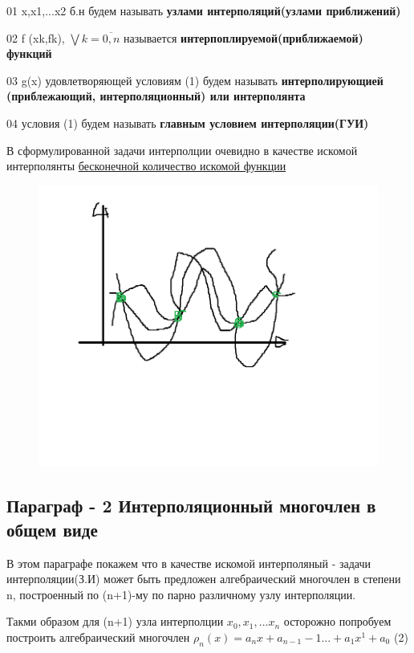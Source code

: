\documentclass{article}
\begin{document}
01 x,x1,...x2 б.н будем называть \textbf{узлами интерполяций(узлами приближений)}

\vspace{3mm}

02 f (xk,fk), $\bigvee k =\overline{0,n}$ называется \textbf{интерпоплируемой(приближаемой) функций}

\vspace{3mm}

03 g(x) удовлетворяющей условиям (1) будем называть \textbf{интерполирующией
(приблежающий, интерполяционный) или  интерполянта }

\vspace{3mm}

04 условия (1) будем называть \textbf{главным условием интерполяции(ГУИ)}

\vspace{3mm}


В сформулированной задачи интерполции очевидно в качестве искомой интерполянты
\underline{ бесконечной количество искомой функции} 

\begin{figure} [H]
    \includegraphics[width=0.50\linewidth]{Без имени1.png}
\end{figure}


\subsection{Параграф - 2  Интерполяционный многочлен в общем виде}

В этом параграфе покажем что в качестве искомой интерполяный - задачи интерполяции(З.И)
может быть предложен алгебраический многочлен в степени n,
построенный по (n+1)-му по парно различному узлу интерполяции.

\vspace{3mm}



Такми образом для (n+1) узла интерполции  $x_0,x_1,...x_n$  осторожно попробуем построить
алгебраический многочлен $\rho_n(x) = a_nx+a_{n-1} -1 ... + a_1x^1+a_0$ (2)
\end{document}
